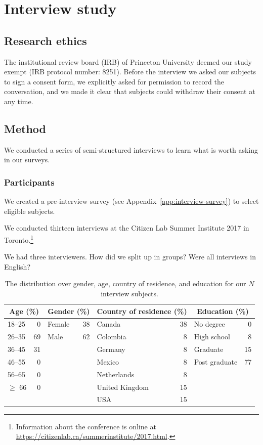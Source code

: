 \section{Interview study}
\label{sec:interview-study}

\subsection{Research ethics}
The institutional review board (IRB) of Princeton University deemed our study
exempt (IRB protocol number: 8251).  Before the interview we asked our subjects
to sign a consent form, we explicitly asked for permission to record the
conversation, and we made it clear that subjects could withdraw their consent at
any time.

\subsection{Method}
We conducted a series of semi-structured interviews to learn what is worth
asking in our surveys.

\subsubsection{Participants}
We created a pre-interview survey (see Appendix~\ref{app:interview-survey}) to
select eligible subjects.

We conducted thirteen interviews at the Citizen Lab Summer Institute 2017 in
Toronto.\footnote{Information about the conference is online at
\url{https://citizenlab.ca/summerinstitute/2017.html}.}  

We had three interviewers.  How did we split up in groups?  Were all interviews in English?

\begin{table}
	\centering
	\begin{tabular}{l r l r l r l r}
	\toprule
	\multicolumn{2}{c}{Age (\%)} &
	\multicolumn{2}{c}{Gender (\%)} &
	\multicolumn{2}{c}{Country of residence (\%)} &
	\multicolumn{2}{c}{Education (\%)} \\
	\midrule
	18--25   & 0  & Female & 38 & Canada         & 38 & No degree     & 0 \\
	26--35   & 69 & Male   & 62 & Colombia       & 8  & High school   & 8 \\
	36--45   & 31 &        &    & Germany        & 8  & Graduate      & 15 \\
	46--55   & 0  &        &    & Mexico         & 8  & Post graduate & 77 \\
	56--65   & 0  &        &    & Netherlands    & 8  & & \\
	$\ge$ 66 & 0  &        &    & United Kingdom & 15 & & \\
	         &    &        &    & USA            & 15 & & \\
	\bottomrule
	\end{tabular}
	\caption{The distribution over gender, age, country of residence, and
	education for our $N$ interview subjects.}
	\label{tab:interviewees}
\end{table}

